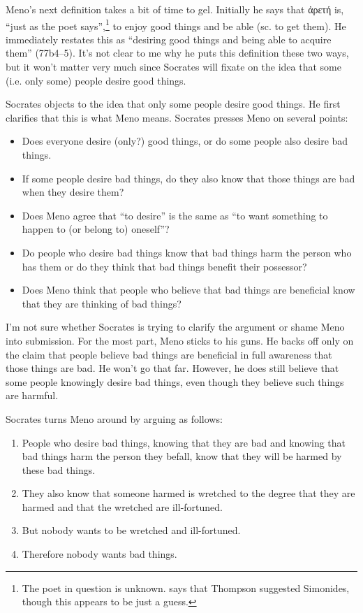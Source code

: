 \documentclass[12pt,letterpaper]{article}
\begin{document}
Meno's next definition takes a bit of time to gel. Initially he says that \textgreek{ἀρετή} is, ``just as the poet says'',\footnote{The poet in question is unknown. \textcite[257]{bluck1961} says that Thompson suggested Simonides, though this appears to be just a guess.} to enjoy good things and be able (sc. to get them). He immediately restates this as ``desiring good things and being able to acquire them'' (77b4--5). It's not clear to me why he puts this definition these two ways, but it won't matter very much since Socrates will fixate on the idea that some (i.e. only some) people desire good things.

Socrates objects to the idea that only some people desire good things. He first clarifies that this is what Meno means. Socrates presses Meno on several points:

\begin{itemize}
    \item Does everyone desire (only?) good things, or do some people also desire bad things.
    \item If some people desire bad things, do they also know that those things are bad when they desire them?
    \item Does Meno agree that ``to desire'' is the same as ``to want something to happen to (or belong to) oneself''?
    \item Do people who desire bad things know that bad things harm the person who has them or do they think that bad things benefit their possessor?
    \item Does Meno think that people who believe that bad things are beneficial know that they are thinking of bad things?
\end{itemize}

I'm not sure whether Socrates is trying to clarify the argument or shame Meno into submission. For the most part, Meno sticks to his guns. He backs off only on the claim that people believe bad things are beneficial in full awareness that those things are bad. He won't go that far. However, he does still believe that some people knowingly desire bad things, even though they believe such things are harmful.

Socrates turns Meno around by arguing as follows:

\begin{enumerate}
    \item People who desire bad things, knowing that they are bad and knowing that bad things harm the person they befall, know that they will be harmed by these bad things.
    \item They also know that someone harmed is wretched to the degree that they are harmed and that the wretched are ill-fortuned.
    \item But nobody wants to be wretched and ill-fortuned.
    \item Therefore nobody wants bad things.
\end{enumerate}
\end{document}
